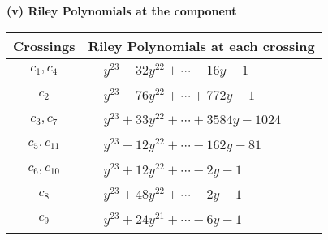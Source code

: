 \documentclass[1p]{elsarticle_modified}
\theoremstyle{definition}
\begin{document}
\newpage\renewcommand{\arraystretch}{1}
\flushleft \textbf{(v) Riley Polynomials at the component}\newline \\
\begin{tabular}{m{50pt}|m{274pt}}
Crossings & \hspace{64pt}Riley Polynomials at each crossing \\
\hline $$\begin{aligned}c_{1},c_{4}\end{aligned}$$&$\begin{aligned}
&y^{23}-32 y^{22}+\cdots-16 y-1
\end{aligned}$\\
\hline $$\begin{aligned}c_{2}\end{aligned}$$&$\begin{aligned}
&y^{23}-76 y^{22}+\cdots+772 y-1
\end{aligned}$\\
\hline $$\begin{aligned}c_{3},c_{7}\end{aligned}$$&$\begin{aligned}
&y^{23}+33 y^{22}+\cdots+3584 y-1024
\end{aligned}$\\
\hline $$\begin{aligned}c_{5},c_{11}\end{aligned}$$&$\begin{aligned}
&y^{23}-12 y^{22}+\cdots-162 y-81
\end{aligned}$\\
\hline $$\begin{aligned}c_{6},c_{10}\end{aligned}$$&$\begin{aligned}
&y^{23}+12 y^{22}+\cdots-2 y-1
\end{aligned}$\\
\hline $$\begin{aligned}c_{8}\end{aligned}$$&$\begin{aligned}
&y^{23}+48 y^{22}+\cdots-2 y-1
\end{aligned}$\\
\hline $$\begin{aligned}c_{9}\end{aligned}$$&$\begin{aligned}
&y^{23}+24 y^{21}+\cdots-6 y-1
\end{aligned}$\\
\hline
\end{tabular}\\~\\
\end{document}

